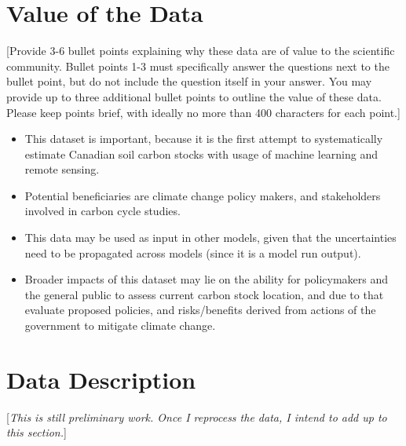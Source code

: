 \documentclass[times,final]{elsarticle}
\begin{document}
\section*{Value of the Data}

[Provide 3-6 bullet points explaining why these data are of value to the scientific community. 
Bullet points 1-3 must specifically answer the questions next to the bullet point, 
but do not include the question itself in your answer. You may 
provide up to three additional bullet points to outline the value of these data. 
Please keep points brief, with ideally no more than 400 characters for each point.]

\begin{itemize}
\itemsep=0pt
\parsep=0pt
\item This dataset is important, because it is the first attempt to systematically estimate Canadian soil carbon stocks with usage of machine learning and remote sensing.
\item Potential beneficiaries are climate change policy makers, and stakeholders involved in carbon cycle studies.
\item This data may be used as input in other models, given that the uncertainties need to be propagated across models (since it is a model run output).
\item Broader impacts of this dataset may lie on the ability for policymakers and the general public to assess current carbon stock location, and due to that evaluate proposed policies, and risks/benefits derived from actions of the government to mitigate climate change. 
\end{itemize}

\section*{Data Description}
[\textit{This is still preliminary work. Once I reprocess the data, I intend to add up to this section.}]
\end{document}
